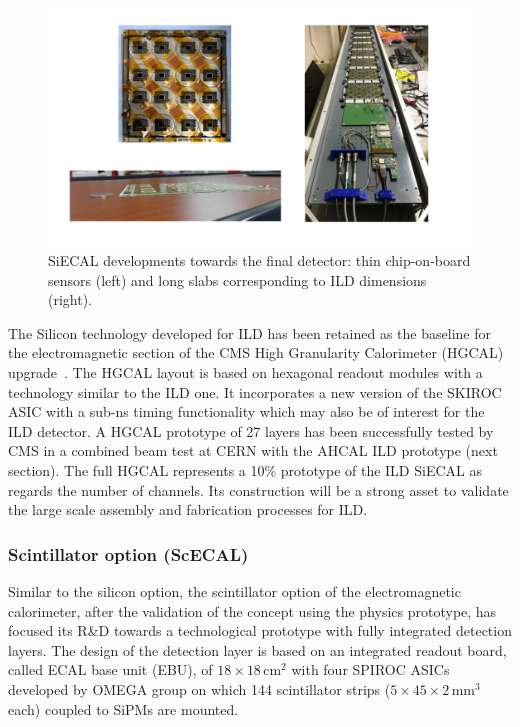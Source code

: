 \begin{figure}[t!]
\centering
\includegraphics[width=1.0\hsize]{Detector/fig/SiWECAL_dev.jpg}
\caption{SiECAL developments towards the final detector: thin chip-on-board sensors (left) and long slabs corresponding to ILD dimensions (right).}
\label{fig:det:SiWECAL_dev}
\end{figure}

The Silicon technology developed for ILD has been retained as the baseline for the electromagnetic section of the CMS High Granularity Calorimeter (HGCAL) upgrade~\cite{Collaboration:2293646}. The HGCAL layout is based on hexagonal readout modules with a technology similar to the ILD one. It incorporates a new version of the SKIROC ASIC with a sub-ns timing functionality which may also be of interest for the ILD detector. A HGCAL prototype of 27 layers has been successfully tested by CMS in a combined beam test at CERN with the AHCAL ILD prototype (next section). The full HGCAL represents a 10\% prototype of the ILD SiECAL as regards the number of channels. Its construction will be a strong asset to validate the large scale assembly and fabrication processes for ILD. 


\subsubsection{Scintillator option (ScECAL)}

Similar to the silicon option, the scintillator option of the electromagnetic calorimeter,
after the validation of the concept using the physics prototype,
has focused its R\&D towards a technological prototype 
with fully integrated detection layers. 
The design of the detection layer is based on an integrated readout board, 
called ECAL base unit (EBU), of $18\times18\,\mathrm{cm}^2$ 
with four SPIROC ASICs developed by OMEGA group\cite{ild:bib:spiroc} on which 144 scintillator strips 
($5\times45\times2\,\mathrm{mm^3}$ each) coupled to SiPMs are mounted.


